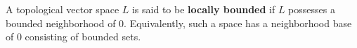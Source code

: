 A topological vector space $L$ is said to be \textbf{locally bounded} if $L$ possesses a bounded neighborhood of $0$. Equivalently, such a space has a neighborhood base of $0$ consisting of bounded sets.
